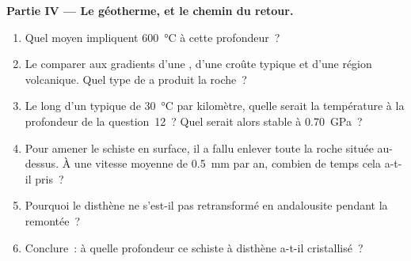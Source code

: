\begin{problem}
\medskip
\noindent\textbf{Partie IV --- Le géotherme, et le chemin du retour.}
\begin{enumerate}[resume]
  \item Quel  moyen impliquent \qty{600}{\celsius} à
        cette profondeur~?
  \item Le comparer aux gradients d'une , d'une croûte
        typique et d'une région volcanique. Quel type de  a
        produit la roche~?
  \item Le long d'un  typique de \qty{30}{\celsius} par kilomètre,
        quelle serait la température à la profondeur de la question~12~?
        Quel  serait alors stable à \qty{0.70}{GPa}~?
  \item Pour amener le schiste en surface, il a fallu enlever toute la
        roche située au-dessus. À une vitesse moyenne de \qty{0.5}{mm} par
        an, combien de temps cela a-t-il pris~?
  \item Pourquoi le disthène ne s'est-il pas retransformé en andalousite
        pendant la remontée~?
  \item Conclure~: à quelle profondeur ce schiste à disthène a-t-il
        cristallisé~?
\end{enumerate}
\end{problem}
